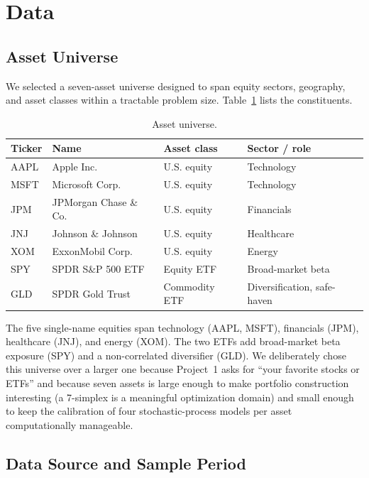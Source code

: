 \documentclass[11pt,letterpaper]{article}
\begin{document}
\section{Data}

\subsection{Asset Universe}

We selected a seven-asset universe designed to span equity sectors, geography, and asset classes within a tractable problem size. Table~\ref{tab:universe} lists the constituents.

\begin{table}[h]
\centering
\caption{Asset universe.}
\label{tab:universe}
\begin{tabular}{llll}
\toprule
Ticker & Name & Asset class & Sector / role \\
\midrule
AAPL & Apple Inc. & U.S. equity & Technology \\
MSFT & Microsoft Corp. & U.S. equity & Technology \\
JPM  & JPMorgan Chase \& Co. & U.S. equity & Financials \\
JNJ  & Johnson \& Johnson & U.S. equity & Healthcare \\
XOM  & ExxonMobil Corp. & U.S. equity & Energy \\
SPY  & SPDR S\&P 500 ETF & Equity ETF & Broad-market beta \\
GLD  & SPDR Gold Trust & Commodity ETF & Diversification, safe-haven \\
\bottomrule
\end{tabular}
\end{table}

The five single-name equities span technology (AAPL, MSFT), financials (JPM), healthcare (JNJ), and energy (XOM). The two ETFs add broad-market beta exposure (SPY) and a non-correlated diversifier (GLD). We deliberately chose this universe over a larger one because Project~1 asks for ``your favorite stocks or ETFs'' and because seven assets is large enough to make portfolio construction interesting (a 7-simplex is a meaningful optimization domain) and small enough to keep the calibration of four stochastic-process models per asset computationally manageable.

\subsection{Data Source and Sample Period}
\end{document}

